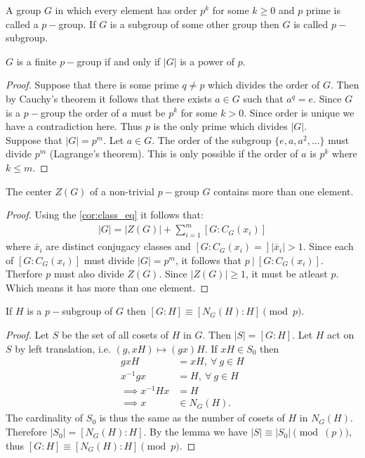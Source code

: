 \begin{definition}
  A group $G$ in which every element has order $p^k$ for some $k\geq 0$ and $p$ prime is called a $p-$group. If $G$ is a subgroup of some other group then $G$ is called $p-$subgroup.
\end{definition}
\begin{corollary}
  $G$ is a finite $p-$group if and only if $|G|$ is a power of $p$.
\end{corollary}
\begin{proof}
  Suppose that there is some prime $q \neq p$ which divides the order of $G$. Then by Cauchy's theorem it follows that there exists $a\in G$ such that $a^q =e$. Since $G$ is a $p-$group the order of $a$ must be $p^k$ for some $k>0$. Since order is unique we have a contradiction here. Thus $p$ is the only prime which divides $|G|$.\\

  Suppose that $|G| = p^m$. Let $a\in G$. The order of the subgroup $\{e,a,a^2,...\}$ must divide $p^m$ (Lagrange's theorem). This is only possible if the order of $a$ is $p^k$ where $k\leq m$.
\end{proof}
\begin{proposition}
  The center $Z(G)$ of a non-trivial $p-$group $G$ contains more than one element.
\end{proposition}
\begin{proof}
  Using the \cref{cor:class_eq} it follows that:
  \begin{align*}
    |G| = |Z(G)| + \sum_{i=1}^m [G: C_G(x_i)]
  \end{align*}
  where $\bar{x}_i$ are distinct conjugacy classes and $[G:C_G(x_i) = ]|\bar{x}_i| > 1$. Since each of $[G:C_G(x_i)]$ must divide $|G| = p^m$, it follows that $p\ |\ [G:C_G(x_i)]$. Therfore $p$ must also divide $Z(G)$. Since $|Z(G)| \geq 1$, it must be atleast $p$. Which means it has more than one element.
\end{proof}
\begin{lemma}
  If $H$ is a $p-$subgroup of $G$ then $[G:H] \equiv [N_G(H):H]\pmod{p}$.
\end{lemma}
\begin{proof}
  Let $S$ be the set of all cosets of $H$ in $G$. Then $|S| = [G:H]$. Let $H$ act on $S$ by left translation, i.e. $(g,xH)\mapsto (gx)H$. If $xH \in S_0$ then
  \begin{align*}
    gxH &= xH,\ \forall\ g\in H\\
    x^{-1}gx &= H,\ \forall\ g\in H\\
    \implies x^{-1}Hx &= H\\
    \implies x&\in N_G(H).
  \end{align*}
  The cardinality of $S_0$ is thus the same as the number of cosets of $H$ in $N_G(H)$. Therefore $|S_0| = [N_G(H): H]$. By the lemma we have $|S|\equiv |S_0| \pmod(p)$, thus $[G:H] \equiv [N_G(H):H] \pmod{p}$. 
\end{proof}
